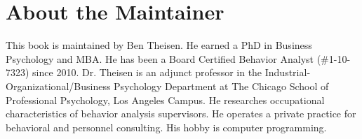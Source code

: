 \chapter{About the Maintainer}

This book is maintained by Ben Theisen. He earned a PhD in Business Psychology and MBA. He has been a Board Certified Behavior Analyst (\#1-10-7323) since 2010. Dr. Theisen is an adjunct professor in the Industrial-Organizational/Business Psychology Department at The Chicago School of Professional Psychology, Los Angeles Campus. He researches occupational characteristics of behavior analysis supervisors. He operates a private practice for behavioral and personnel consulting. His hobby is computer programming.
\clearpage
